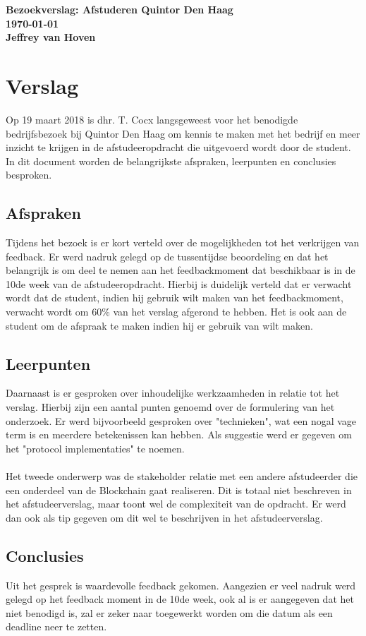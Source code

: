 \documentclass[notitlepage]{report}
\begin{document}
  {
    \bfseries\centering
    Bezoekverslag: Afstuderen Quintor Den Haag \\
    \today \\
    Jeffrey van Hoven
  \par}
  \vspace{1cm} 

  \section*{Verslag}
    Op 19 maart 2018 is dhr. T. Cocx langsgeweest voor het benodigde bedrijfsbezoek bij Quintor Den Haag om kennis te maken met het bedrijf en meer inzicht te krijgen in de afstudeeropdracht die uitgevoerd wordt door de student. In dit document worden de belangrijkste afspraken, leerpunten en conclusies besproken.

    \subsection*{Afspraken}
      Tijdens het bezoek is er kort verteld over de mogelijkheden tot het verkrijgen van feedback. Er werd nadruk gelegd op de tussentijdse beoordeling en dat het belangrijk is om deel te nemen aan het feedbackmoment dat beschikbaar is in de 10de week van de afstudeeropdracht. Hierbij is duidelijk verteld dat er verwacht wordt dat de student, indien hij gebruik wilt maken van het feedbackmoment, verwacht wordt om 60\% van het verslag afgerond te hebben. Het is ook aan de student om de afspraak te maken indien hij er gebruik van wilt maken.

    \subsection*{Leerpunten}
      Daarnaast is er gesproken over inhoudelijke werkzaamheden in relatie tot het verslag. Hierbij zijn een aantal punten genoemd over de formulering van het onderzoek. Er werd bijvoorbeeld gesproken over "technieken", wat een nogal vage term is en meerdere betekenissen kan hebben. Als suggestie werd er gegeven om het "protocol implementaties" te noemen.\\ \\
      Het tweede onderwerp was de stakeholder relatie met een andere afstudeerder die een onderdeel van de Blockchain gaat realiseren. Dit is totaal niet beschreven in het afstudeerverslag, maar toont wel de complexiteit van de opdracht. Er werd dan ook als tip gegeven om dit wel te beschrijven in het afstudeerverslag.

    \subsection*{Conclusies}
      Uit het gesprek is waardevolle feedback gekomen. Aangezien er veel nadruk werd gelegd op het feedback moment in de 10de week, ook al is er aangegeven dat het niet benodigd is, zal er zeker naar toegewerkt worden om die datum als een deadline neer te zetten.
\end{document}
